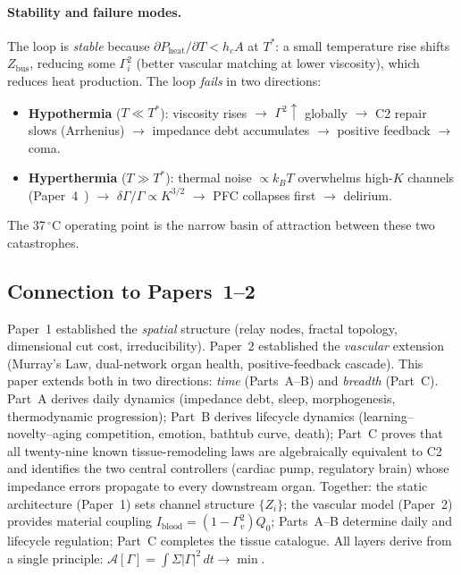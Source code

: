 \documentclass[aps,pre,twocolumn,superscriptaddress,floatfix]{revtex4-2}
\begin{document}
\paragraph{Stability and failure modes.}
The loop is \emph{stable} because $\partial P_{\mathrm{heat}}/
\partial T < h_c A$ at $T^*$:
a small temperature rise shifts $Z_{\mathrm{bus}}$,
reducing some $\Gamma_i^2$ (better vascular matching at
lower viscosity), which reduces heat production.
The loop \emph{fails} in two directions:
\begin{itemize}
  \item \textbf{Hypothermia} ($T \ll T^*$):
    viscosity rises $\to$ $\Gamma^2\!\uparrow$ globally
    $\to$ C2 repair slows (Arrhenius)
    $\to$ impedance debt accumulates
    $\to$ positive feedback $\to$ coma.
  \item \textbf{Hyperthermia} ($T \gg T^*$):
    thermal noise $\propto k_B T$ overwhelms
    high-$K$ channels (Paper~4~\cite{Paper4})
    $\to$ $\delta\Gamma/\Gamma \propto K^{3/2}$
    $\to$ PFC collapses first $\to$ delirium.
\end{itemize}
The 37$\,^\circ$C operating point is
the narrow basin of attraction between these two
catastrophes.

\subsection{Connection to Papers~1--2}

Paper~1 established the \emph{spatial} structure
(relay nodes, fractal topology, dimensional cut cost,
irreducibility).
Paper~2 established the \emph{vascular} extension
(Murray's Law, dual-network organ health,
positive-feedback cascade).
This paper extends both in two directions:
\emph{time} (Parts~A--B) and \emph{breadth}
(Part~C).
Part~A derives daily dynamics (impedance debt, sleep,
morphogenesis, thermodynamic progression);
Part~B derives lifecycle dynamics (learning--novelty--aging
competition, emotion, bathtub curve, death);
Part~C proves that all twenty-nine known tissue-remodeling
laws are algebraically equivalent to C2
and identifies the two central controllers
(cardiac pump, regulatory brain) whose impedance
errors propagate to every downstream organ.
Together: the static architecture (Paper~1) sets channel
structure $\{Z_i\}$; the vascular model (Paper~2) provides
material coupling $I_{\mathrm{blood}} = (1-\Gamma_v^2)Q_0$;
Parts~A--B determine daily and lifecycle regulation;
Part~C completes the tissue catalogue.
All layers derive from a single principle:
$\mathcal{A}[\Gamma] = \int \Sigma|\Gamma|^2\,dt \to \min$.
\end{document}
